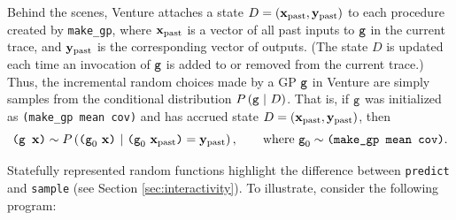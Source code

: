 Behind the scenes, Venture attaches a state $D = (\mathbf{x}_{\textrm{past}}, \mathbf{y}_{\textrm{past}})$ to
each procedure created by \texttt{make\_gp}, where $\mathbf{x}_{\textrm{past}}$ is a vector of
all past inputs to $\texttt{g}$ in the current trace, and $\mathbf{y}_{\textrm{past}}$ is the
corresponding vector of outputs.  (The state $D$ is updated each time an
invocation of $\texttt{g}$ is added to or removed from the current trace.)  Thus, the
incremental random choices made by a GP $\texttt{g}$ in Venture are simply samples
from the conditional distribution $P\left( \texttt{g} \ \middle\vert\  D \right)$.  That is, if $\texttt{g}$ was
initialized as \texttt{(make\_gp mean cov)} and has accrued state $D =
(\mathbf{x}_{\textrm{past}}, \mathbf{y}_{\textrm{past}})$, then
\[
\texttt{(g }\mathbf{x}\texttt{)}
\sim
P\left( 
  \texttt{(g}_0\ \mathbf{x}\texttt{)}
  \ \middle\vert\ 
  \texttt{(g}_0\ \mathbf{x}_{\textrm{past}}\texttt{)} = \mathbf{y}_{\textrm{past}}
 \right), \qquad\text{where $\texttt{g}_0 \sim \texttt{(make\_gp mean cov)}$}.
\]

Statefully represented random functions highlight the difference between
\texttt{predict} and \texttt{sample} (see Section \ref{sec:interactivity}).  To
illustrate, consider the following program:

